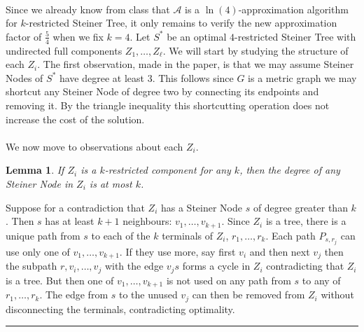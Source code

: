 \documentclass[letterpaper,12pt,oneside,onecolumn]{article}
\newcommand{\cA}{\mathcal{A}} \newcommand{\cB}{\mathcal{B}}
\newenvironment{proof}{{\bf Proof:  }}{\hfill\rule{2mm}{2mm}}
\newtheorem{lemma}[fact]{Lemma}
\begin{document}
\paragraph{}
Since we already know from class that $\cA$ is a $\ln(4)$-approximation algorithm for $k$-restricted Steiner Tree, it only remains to verify the new approximation factor of $\frac{5}{4}$ when we fix $k=4$. Let $S^*$ be an optimal $4$-restricted Steiner Tree with undirected full components $Z_1, \dots, Z_\ell$. We will start by studying the structure of each $Z_i$. The first observation, made in the paper, is that we may assume Steiner Nodes of $S^*$ have degree at least $3$. This follows since $G$ is a metric graph we may shortcut any Steiner Node of degree two by connecting its endpoints and removing it. By the triangle inequality this shortcutting operation does not increase the cost of the solution.
\paragraph{}
We now move to observations about each $Z_i$.
\begin{lemma}\label{lemma:dk}
If $Z_i$ is a $k$-restricted component for any $k$, then the degree of any Steiner Node in $Z_i$ is at most $k$.
\end{lemma}
\begin{proof}
Suppose for a contradiction that $Z_i$ has a Steiner Node $s$ of degree greater than $k$. Then $s$ has at least $k+1$ neighbours: $v_1, \dots, v_{k+1}$. Since $Z_i$ is a tree, there is a unique path from $s$ to each of the $k$ terminals of $Z_i$, $r_1, \dots, r_k$. Each path $P_{s,r_j}$ can use only one of $v_1,\dots, v_{k+1}$. If they use more, say first $v_i$ and then next $v_j$ then the subpath $r,v_i,\dots,v_j$ with the edge $v_js$ forms a cycle in $Z_i$ contradicting that $Z_i$ is a tree. But then one of $v_1, \dots, v_{k+1}$ is not used on any path from $s$ to any of $r_1, \dots, r_k$. The edge from $s$ to the unused $v_j$ can then be removed from $Z_i$ without disconnecting the terminals, contradicting optimality.
\end{proof}
\end{document}

